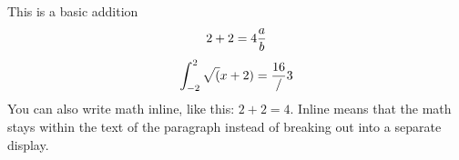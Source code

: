 



This is a basic addition
$$
2 + 2 = 4 
{{a} \over {b}}
$$
$$
\int_{-2}^2 \sqrt(x+2) ={{16} \over {/}}{3}
$$
You can also write math inline, like this: $2 + 2 = 4$. Inline means that the
math stays within the text of the paragraph instead of breaking out into a
separate display.

\bye
